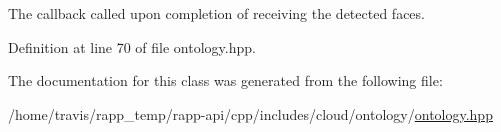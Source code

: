 The callback called upon completion of receiving the detected faces. 



Definition at line 70 of file ontology.\-hpp.



The documentation for this class was generated from the following file\-:\begin{DoxyCompactItemize}
\item 
/home/travis/rapp\-\_\-temp/rapp-\/api/cpp/includes/cloud/ontology/\hyperlink{ontology_8hpp}{ontology.\-hpp}\end{DoxyCompactItemize}
